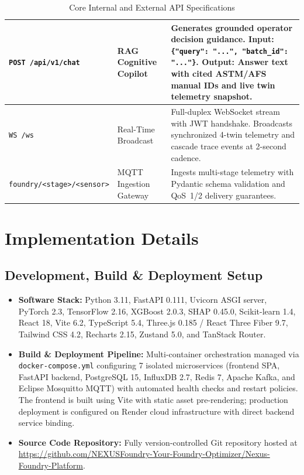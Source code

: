 \documentclass[11pt, a4paper]{article}
\begin{document}
\begin{table}[H]
\begin{tabular}{|p{3.8cm}|p{3.6cm}|p{6.4cm}|}
        \texttt{POST /api/v1/chat} & RAG Cognitive Copilot & Generates grounded operator decision guidance. \newline \textbf{Input:} \texttt{\{"query": "...", "batch\_id": "..."\}}. \newline \textbf{Output:} Answer text with cited ASTM/AFS manual IDs and live twin telemetry snapshot. \\
        \hline
        \texttt{WS /ws} & Real-Time Broadcast & Full-duplex WebSocket stream with JWT handshake. Broadcasts synchronized 4-twin telemetry and cascade trace events at 2-second cadence. \\
        \hline
        \texttt{foundry/<stage>/<sensor>} & MQTT Ingestion Gateway & Ingests multi-stage telemetry with Pydantic schema validation and QoS~1/2 delivery guarantees. \\
        \hline
    \end{tabular}
    \caption{Core Internal and External API Specifications}
    \label{tab:api-contracts}
\end{table}

\section{Implementation Details}

\subsection{Development, Build \& Deployment Setup}
\begin{itemize}[noitemsep, topsep=2pt]
    \item \textbf{Software Stack:} Python 3.11, FastAPI 0.111, Uvicorn ASGI server, PyTorch 2.3, TensorFlow 2.16, XGBoost 2.0.3, SHAP 0.45.0, Scikit-learn 1.4, React 18, Vite 6.2, TypeScript 5.4, Three.js 0.185 / React Three Fiber 9.7, Tailwind CSS 4.2, Recharts 2.15, Zustand 5.0, and TanStack Router.
    \item \textbf{Build \& Deployment Pipeline:} Multi-container orchestration managed via \texttt{docker-compose.yml} configuring 7 isolated microservices (frontend SPA, FastAPI backend, PostgreSQL 15, InfluxDB 2.7, Redis 7, Apache Kafka, and Eclipse Mosquitto MQTT) with automated health checks and restart policies. The frontend is built using Vite with static asset pre-rendering; production deployment is configured on Render cloud infrastructure with direct backend service binding.
    \item \textbf{Source Code Repository:} Fully version-controlled Git repository hosted at \url{https://github.com/NEXUSFoundry-Your-Foundry-Optimizer/Nexus-Foundry-Platform}.
\end{itemize}
\end{document}
